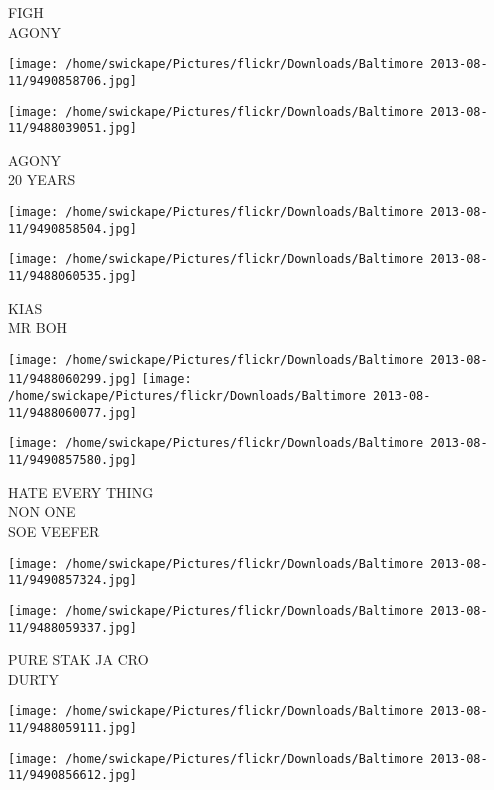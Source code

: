 \documentclass[10pt,letterpaper]{article}
\begin{document}
FIGH\\
AGONY\\
\pagebreak

\texttt{[image: /home/swickape/Pictures/flickr/Downloads/Baltimore 2013-08-11/9490858706.jpg]}

\vspace{0.25in}
\texttt{[image: /home/swickape/Pictures/flickr/Downloads/Baltimore 2013-08-11/9488039051.jpg]}

AGONY\\
20 YEARS\\
\pagebreak

\texttt{[image: /home/swickape/Pictures/flickr/Downloads/Baltimore 2013-08-11/9490858504.jpg]}

\vspace{0.25in}
\texttt{[image: /home/swickape/Pictures/flickr/Downloads/Baltimore 2013-08-11/9488060535.jpg]}

KIAS\\
MR BOH\\
\pagebreak

\texttt{[image: /home/swickape/Pictures/flickr/Downloads/Baltimore 2013-08-11/9488060299.jpg]}
\texttt{[image: /home/swickape/Pictures/flickr/Downloads/Baltimore 2013-08-11/9488060077.jpg]}

\vspace{0.25in}
\texttt{[image: /home/swickape/Pictures/flickr/Downloads/Baltimore 2013-08-11/9490857580.jpg]}

HATE EVERY THING\\
NON ONE\\
SOE VEEFER\\
\pagebreak

\texttt{[image: /home/swickape/Pictures/flickr/Downloads/Baltimore 2013-08-11/9490857324.jpg]}

\vspace{0.25in}
\texttt{[image: /home/swickape/Pictures/flickr/Downloads/Baltimore 2013-08-11/9488059337.jpg]}

PURE STAK JA CRO\\
DURTY\\
\pagebreak

\texttt{[image: /home/swickape/Pictures/flickr/Downloads/Baltimore 2013-08-11/9488059111.jpg]}

\vspace{0.25in}
\texttt{[image: /home/swickape/Pictures/flickr/Downloads/Baltimore 2013-08-11/9490856612.jpg]}
\end{document}
